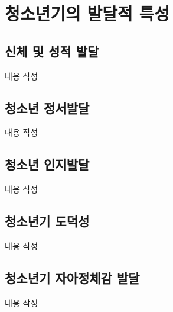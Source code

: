 \section{청소년기의 발달적 특성}

\subsection{신체 및 성적 발달}
내용 작성

\subsection{청소년 정서발달}
내용 작성

\subsection{청소년 인지발달}
내용 작성

\subsection{청소년기 도덕성}
내용 작성

\subsection{청소년기 자아정체감 발달}
내용 작성
